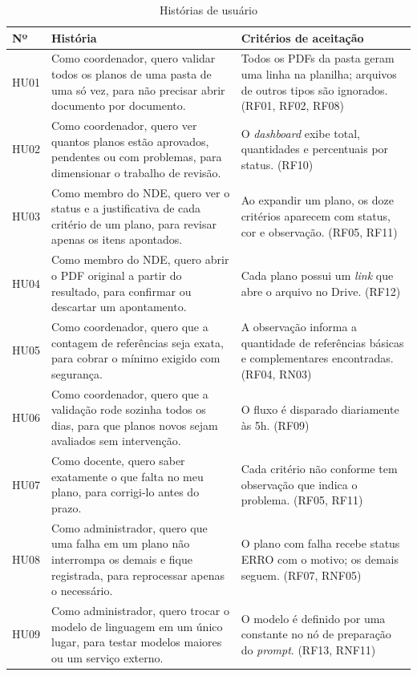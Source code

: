 \begin{table}[H]
\centering
\caption{Histórias de usuário}
\label{tab:historias}
\footnotesize
\begin{tabular}{@{}L{1.1cm}L{7.0cm}L{6.3cm}@{}}
\toprule
{}
\textbf{Nº} & \textbf{História} & \textbf{Critérios de aceitação} \\ \midrule
HU01 & Como coordenador, quero validar todos os planos de uma pasta de uma só vez, para não precisar abrir documento por documento. & Todos os PDFs da pasta geram uma linha na planilha; arquivos de outros tipos são ignorados. (RF01, RF02, RF08) \\
HU02 & Como coordenador, quero ver quantos planos estão aprovados, pendentes ou com problemas, para dimensionar o trabalho de revisão. & O \textit{dashboard} exibe total, quantidades e percentuais por status. (RF10) \\
HU03 & Como membro do NDE, quero ver o status e a justificativa de cada critério de um plano, para revisar apenas os itens apontados. & Ao expandir um plano, os doze critérios aparecem com status, cor e observação. (RF05, RF11) \\
HU04 & Como membro do NDE, quero abrir o PDF original a partir do resultado, para confirmar ou descartar um apontamento. & Cada plano possui um \textit{link} que abre o arquivo no Drive. (RF12) \\
HU05 & Como coordenador, quero que a contagem de referências seja exata, para cobrar o mínimo exigido com segurança. & A observação informa a quantidade de referências básicas e complementares encontradas. (RF04, RN03) \\
HU06 & Como coordenador, quero que a validação rode sozinha todos os dias, para que planos novos sejam avaliados sem intervenção. & O fluxo é disparado diariamente às 5h. (RF09) \\
HU07 & Como docente, quero saber exatamente o que falta no meu plano, para corrigi-lo antes do prazo. & Cada critério não conforme tem observação que indica o problema. (RF05, RF11) \\
HU08 & Como administrador, quero que uma falha em um plano não interrompa os demais e fique registrada, para reprocessar apenas o necessário. & O plano com falha recebe status ERRO com o motivo; os demais seguem. (RF07, RNF05) \\
HU09 & Como administrador, quero trocar o modelo de linguagem em um único lugar, para testar modelos maiores ou um serviço externo. & O modelo é definido por uma constante no nó de preparação do \textit{prompt}. (RF13, RNF11) \\ \bottomrule
\end{tabular}
\end{table}

